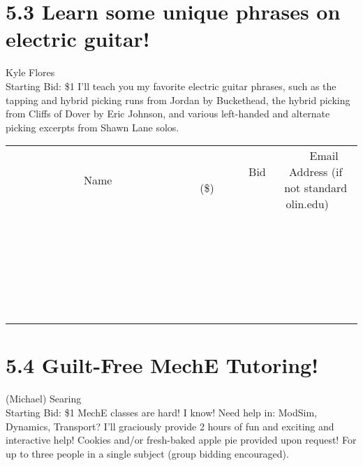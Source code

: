 \documentclass[11pt]{article}
\begin{document}
\section*{5.3 Learn some unique phrases on electric guitar!}
Kyle Flores
\\
Starting Bid: \$1
\newline
I'll teach you my favorite electric guitar phrases, such as the tapping and hybrid picking runs from Jordan by Buckethead, the hybrid picking from Cliffs of Dover by Eric Johnson, and various left-handed and alternate picking excerpts from Shawn Lane solos.
\\[6ex]
\begin{tabular}{c c c}
~~~~~~~~~~~~~Name~~~~~~~~~~~~~ & ~~~~~~~~~Bid (\$)~~~~~~~~~  & ~~~Email Address (if not standard olin.edu)~~~\\
 & & \\
\hline
 & & \\
\hline
 & & \\
\hline
 & & \\
\hline
 & & \\
\hline
 & & \\
\hline
 & & \\
\hline
 & & \\
\hline
 & & \\
\hline
 & & \\
\hline
 & & \\
\hline
 & & \\
\hline
 & & \\
\hline
 & & \\
\hline
 & & \\
\hline
 & & \\
\hline
 & & \\
\hline
 & & \\
\hline
 & & \\
\hline
 & & \\
\hline
 & & \\
\hline
 & & \\
\hline
 & & \\
\hline
 & & \\
\hline
 & & \\
\hline
 & & \\
\hline
\end{tabular}
\newpage
\section*{5.4 Guilt-Free MechE Tutoring!}
(Michael) Searing
\\
Starting Bid: \$1
\newline
MechE classes are hard!  I know!  Need help in: ModSim, Dynamics, Transport?  I'll graciously provide 2 hours of fun and exciting and interactive help!  Cookies and/or fresh-baked apple pie provided upon request!  For up to three people in a single subject (group bidding encouraged).
\end{document}
